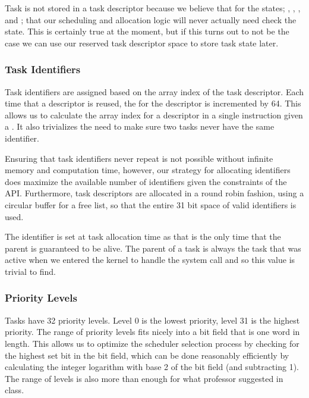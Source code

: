 \documentclass[pdftex,10pt,a4paper]{article}
\begin{document}
Task  is not stored in a task descriptor because we believe
that for the states; , , , and
; that our scheduling and allocation logic will never
actually need check the state. This is certainly true at the moment,
but if this turns out to not be the case we can use our reserved task
descriptor space to store task state later.

\subsubsection*{Task Identifiers}

Task identifiers are assigned based on the array index of the task
descriptor. Each time that a descriptor is reused, the  for
the descriptor is incremented by 64. This allows us to calculate the
array index for a descriptor in a single instruction given a
. It also trivializes the need to make sure two tasks never
have the same identifier.

Ensuring that task identifiers never repeat is not possible without
infinite memory and computation time, however, our strategy for
allocating identifiers does maximize the available number of
identifiers given the constraints of the API. Furthermore, task
descriptors are allocated in a round robin fashion, using a circular
buffer for a free list, so that the entire 31 bit space of valid
identifiers is used.

The  identifier is set at task allocation time as that is
the only time that the parent is guaranteed to be alive. The parent of
a task is always the task that was active when we entered the kernel
to handle the system call and so this value is trivial to find.

\subsubsection*{Priority Levels}

Tasks have 32 priority levels. Level 0 is the lowest priority, level
31 is the highest priority. The range of priority levels fits nicely
into a bit field that is one word in length. This allows us to
optimize the scheduler selection process by checking for the highest
set bit in the bit field, which can be done reasonably efficiently by
calculating the integer logarithm with base 2 of the bit field (and
subtracting 1). The range of levels is also more than enough for what
professor suggested in class.
\end{document}
